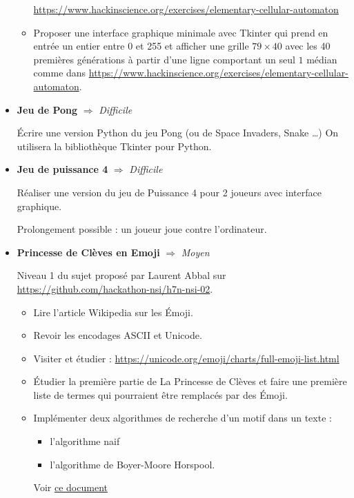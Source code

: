 \documentclass[a4paper, french, 12pt]{article}  %
\newcounter{thme}
\newcounter{prop}
\newcounter{alg}
\begin{document}
\begin{itemize}
\begin{itemize}
\url{https://www.hackinscience.org/exercises/elementary-cellular-automaton}
\item Proposer une interface graphique minimale avec Tkinter qui prend en entrée un entier entre 0 et 255 et afficher une grille $79 \times 40$ avec les 40 premières générations à partir d'une ligne comportant un seul $1$ médian comme dans \url{https://www.hackinscience.org/exercises/elementary-cellular-automaton}.

\end{itemize}


\bigskip


\item \textbf{Jeu de Pong}   $\Rightarrow$ \textit{Difficile}

\medskip

Écrire une version Python du jeu Pong (ou de Space Invaders, Snake \ldots) On utilisera la bibliothèque Tkinter pour Python.

\bigskip



\item \textbf{Jeu de puissance 4} $\Rightarrow$ \textit{Difficile}

\medskip

Réaliser une version du jeu de Puissance 4 pour 2 joueurs avec interface graphique.


Prolongement possible : un joueur joue contre l'ordinateur.  


\bigskip 


\item \textbf{Princesse de Clèves en Emoji}  $\Rightarrow$ \textit{Moyen}

Niveau 1 du sujet proposé par Laurent Abbal sur \url{https://github.com/hackathon-nsi/h7n-nsi-02}.

\begin{itemize}
\item     Lire l'article Wikipedia sur les Émoji.
 \item   Revoir les encodages ASCII et Unicode.
  \item   Visiter et étudier : \url{https://unicode.org/emoji/charts/full-emoji-list.html}
   \item  Étudier la première partie de La Princesse de Clèves et faire une première liste de termes qui pourraient être remplacés par des Émoji.
   \item Implémenter deux algorithmes de recherche d'un motif dans un texte :
   	\begin{itemize}
   		\item l'algorithme naif
   		\item l'algorithme de Boyer-Moore Horspool.  
\end{itemize}   	 
Voir \href{https://cache.media.eduscol.education.fr/file/NSI/63/5/RA20_NSI_G_T_boyer-moore_1298635.pdf}{ce document}


\end{itemize}
\end{itemize}
\end{document}
